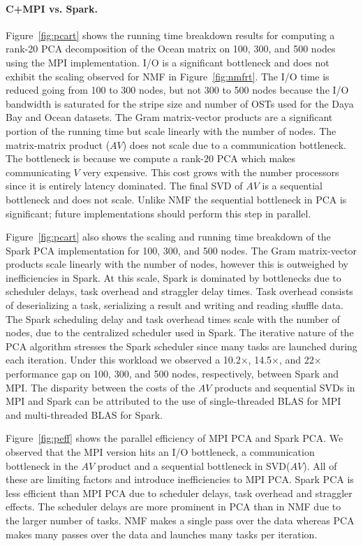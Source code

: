 \paragraph{C+MPI vs. Spark.}
Figure~\ref{fig:pcart} shows the running time breakdown results for computing a rank-20 PCA decomposition of the Ocean matrix on 100, 300, and 500 nodes using the MPI implementation. I/O is a significant bottleneck and does not exhibit the scaling observed for NMF in Figure~\ref{fig:nmfrt}. The I/O time is reduced going from 100 to 300 nodes, but not 300 to 500 nodes because the I/O bandwidth is saturated for the stripe size and number of OSTs used for the Daya Bay and Ocean datasets. The Gram matrix-vector products are a significant portion of the running time but scale linearly with the number of nodes. The matrix-matrix product ($AV$) does not scale due to a communication bottleneck. The bottleneck is because we compute a rank-$20$ PCA which makes communicating $V$ very expensive. This cost grows with the number processors since it is entirely latency dominated. The final SVD of $AV$ is a sequential bottleneck and does not scale. Unlike NMF the sequential bottleneck in PCA is significant; future implementations should perform this step in parallel.

Figure~\ref{fig:pcart} also shows the scaling and running time breakdown of the Spark PCA implementation for 100, 300, and 500 nodes. The Gram matrix-vector products scale linearly with the number of nodes, however this is outweighed by inefficiencies in Spark. At this scale, Spark is dominated by bottlenecks due to scheduler delays, task overhead and straggler delay times. Task overhead consists of deserializing a task, serializing a result and writing and reading shuffle data. The Spark scheduling delay and task overhead times scale with the number of nodes, due to the centralized scheduler used in Spark. The iterative nature of the PCA algorithm stresses the Spark scheduler since many tasks are launched during each iteration. Under this workload we observed a 10.2$\times$, 14.5$\times$, and 22$\times$ performance gap on 100, 300, and 500 nodes, respectively, between Spark and MPI. The disparity between the costs of the $AV$ products and sequential SVDs in MPI and Spark can be attributed to the use of single-threaded BLAS for MPI and multi-threaded BLAS for Spark.

Figure~\ref{fig:peff} shows the parallel efficiency of MPI PCA and Spark PCA. We observed that the MPI version hits an I/O bottleneck, a communication bottleneck in the $AV$ product and a sequential bottleneck in SVD($AV$). All of these are limiting factors and introduce inefficiencies to MPI PCA. Spark PCA is less efficient than MPI PCA due to scheduler delays, task overhead and straggler effects. The scheduler delays are more prominent in PCA than in NMF due to the larger number of tasks. NMF makes a single pass over the data whereas PCA makes many passes over the data and launches many tasks per iteration.


